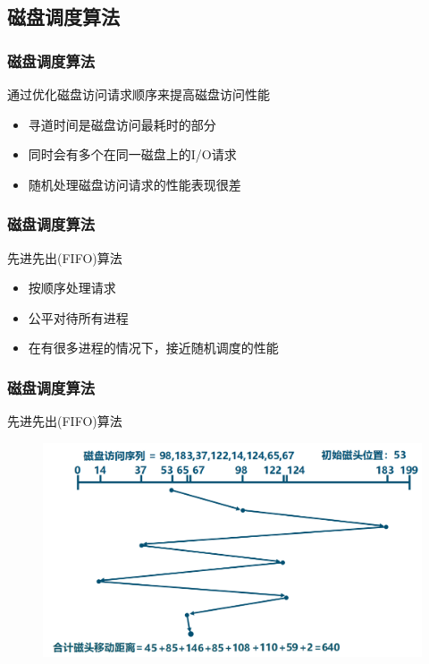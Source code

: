 \subsection{磁盘调度算法} %
\begin{frame}[fragile]
    \frametitle{磁盘调度算法}
   通过优化磁盘访问请求顺序来提高磁盘访问性能
    \begin{itemize}
        \item 寻道时间是磁盘访问最耗时的部分
        \item 同时会有多个在同一磁盘上的I/O请求
        \item 随机处理磁盘访问请求的性能表现很差

    \end{itemize}
\end{frame}

\begin{frame}[fragile]
    \frametitle{磁盘调度算法}
    先进先出(FIFO)算法
    \begin{itemize}
        \item 按顺序处理请求
        \item 公平对待所有进程
        \item 在有很多进程的情况下，接近随机调度的性能
    \end{itemize}
\end{frame}

\begin{frame}[fragile]
    \frametitle{磁盘调度算法}
    先进先出(FIFO)算法
    \begin{figure}
    \includegraphics[width=0.7\linewidth]{figs/disk-fifo.png}
\end{figure}
\end{frame}

